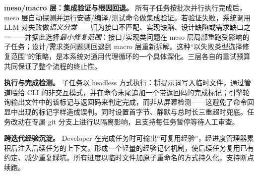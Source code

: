 \textbf{meso/macro 层：集成验证与根因回退。} 所有子任务按批次并行执行完成后，meso 层自动探测并运行安装/编译/测试命令做集成验证。若验证失败，系统调用 LLM 对失败做\emph{语义分类}——归为接口不匹配、实现缺陷、设计缺陷或需求缺口之一——并据此选择\emph{最小修复范围}：接口/实现类问题在 meso 层局部重跑受影响的子任务；设计/需求类问题则回退到 macro 层重新拆解。这种“以失败类型选择修复范围”的策略，是本系统对通用代理循环的一个具体深化。三层各自的重试预算共同保证了整个流程的终止性。

\textbf{执行与完成检测。} 子任务以 headless 方式执行：将提示词写入临时文件，通过管道喂给 CLI 的非交互模式，并在命令末尾追加一个带返回码的完成标记；引擎轮询输出文件中的该标记与返回码来判定完成，而非从屏幕检测——这避免了命令回显中出现的标记字样造成误判。同时设置首字节、静默与总时长三重超时兜底。任务改动在专属 git 分支上进行以隔离影响，且支持每任务暂停等待人工审查。

\textbf{跨迭代经验沉淀。} Developer 在完成任务时可输出“可复用经验”，经进度管理器累积后注入后续任务的上下文，形成一个轻量的经验记忆机制，使后续任务复用已有约定、减少重复踩坑。所有进度以临时文件加原子重命名的方式持久化，支持断点续跑。
